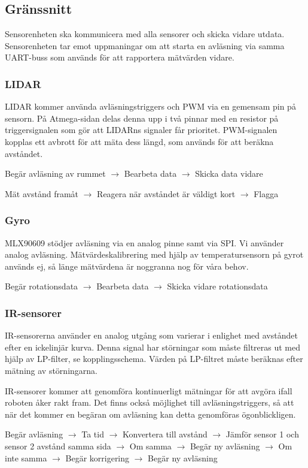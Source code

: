 \documentclass[a4paper,11pt]{article}
\begin{document}
\subsection{Gränssnitt} \label{ssec:sensorInterface}
Sensorenheten ska kommunicera med alla sensorer och skicka vidare utdata. Sensorenheten tar emot uppmaningar om att starta en avläsning via samma UART-buss som används för att rapportera mätvärden vidare.

\subsubsection{LIDAR}
LIDAR kommer använda avläsningstriggers och PWM via en gemensam pin på sensorn. På Atmega-sidan delas denna upp i två pinnar med en resistor på triggersignalen som gör att LIDARns signaler får prioritet. PWM-signalen kopplas ett avbrott för att mäta dess längd, som används för att beräkna avståndet.

Begär avläsning av rummet $\rightarrow$ Bearbeta data $\rightarrow$ Skicka data vidare

Mät avstånd framåt $\rightarrow$ Reagera när avståndet är väldigt kort $\rightarrow$ Flagga

\subsubsection{Gyro}
MLX90609 stödjer avläsning via en analog pinne samt via SPI. Vi använder analog avläsning. Mätvärdeskalibrering med hjälp av temperatursensorn på gyrot används ej, så länge mätvärdena är noggranna nog för våra behov.

Begär rotationsdata $\rightarrow$ Bearbeta data $\rightarrow$ Skicka vidare rotationsdata

\subsubsection{IR-sensorer}
IR-sensorerna använder en analog utgång som varierar i enlighet med avståndet efter en ickelinjär kurva. Denna signal har störningar som måste filtreras ut med hjälp av LP-filter, se kopplingsschema. Värden på LP-filtret måste beräknas efter mätning av störningarna.

IR-sensorer kommer att genomföra kontinuerligt mätningar för att avgöra ifall roboten åker rakt fram. Det finns också möjlighet till avläsningstriggers, så att när det kommer en begäran om avläsning kan detta genomföras ögonblickligen.

Begär avläsning $\rightarrow$ Ta tid $\rightarrow$ Konvertera till avstånd $\rightarrow$ Jämför sensor 1 och sensor 2 avstånd samma sida $\rightarrow$ Om samma $\rightarrow$ Begär ny avläsning $\rightarrow$ Om inte samma $\rightarrow$ Begär korrigering $\rightarrow$ Begär ny avläsning
\end{document}
